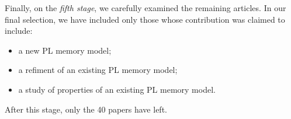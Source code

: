 Finally, on the \emph{fifth stage}, we carefully examined the remaining articles.
In our final selection, we have included only those whose contribution was claimed to include:
\begin{itemize}
  \item a new PL memory model;
  \item a refiment of an existing PL memory model;
  \item a study of properties of an existing PL memory model.
\end{itemize}
After this stage, only the 40 papers have left.


  


  





